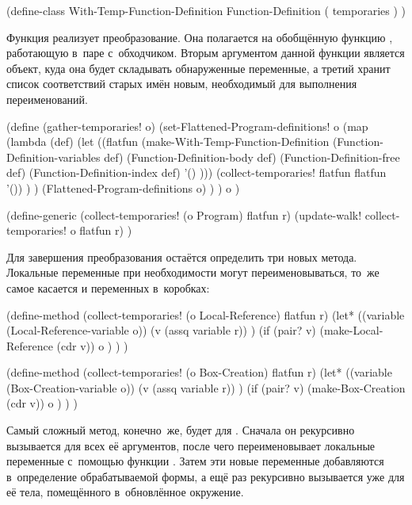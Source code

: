 \begin{code:lisp}
(define-class With-Temp-Function-Definition Function-Definition
  ( temporaries ) )
\end{code:lisp}

Функция  реализует преобразование. Она полагается на
обобщённую функцию , работающую в~паре с~обходчиком.
Вторым аргументом данной функции является объект, куда она будет складывать
обнаруженные переменные, а третий хранит список соответствий старых имён новым,
необходимый для выполнения переименований.

\begin{code:lisp}
(define (gather-temporaries! o)
  (set-Flattened-Program-definitions!
   o (map (lambda (def)
            (let ((flatfun (make-With-Temp-Function-Definition
                            (Function-Definition-variables def)
                            (Function-Definition-body def)
                            (Function-Definition-free def)
                            (Function-Definition-index def)
                            '() )))
              (collect-temporaries! flatfun flatfun '()) ) )
          (Flattened-Program-definitions o) ) )
  o )

(define-generic (collect-temporaries! (o Program) flatfun r)
  (update-walk! collect-temporaries! o flatfun r) )
\end{code:lisp}

Для завершения преобразования остаётся определить три новых метода. Локальные
переменные при необходимости могут переименовываться, то~же самое касается и
переменных в~коробках:

\begin{code:lisp}
(define-method (collect-temporaries! (o Local-Reference) flatfun r)
  (let* ((variable (Local-Reference-variable o))
         (v (assq variable r)) )
    (if (pair? v) (make-Local-Reference (cdr v))
                  o ) ) )

(define-method (collect-temporaries! (o Box-Creation) flatfun r)
  (let* ((variable (Box-Creation-variable o))
         (v (assq variable r)) )
    (if (pair? v) (make-Box-Creation (cdr v))
                  o ) ) )
\end{code:lisp}

Самый сложный метод, конечно~же, будет для . Сначала он рекурсивно
вызывается для всех её аргументов, после чего переименовывает локальные
переменные с~помощью функции . Затем эти новые
переменные добавляются в~определение обрабатываемой формы, а
 ещё раз рекурсивно вызывается уже для её тела,
помещённого в~обновлённое окружение.


